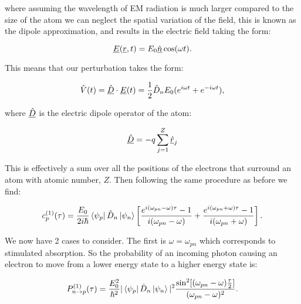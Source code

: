 \noindent where assuming the wavelength of EM radiation is much larger compared to the size of the atom we can neglect the spatial variation of the field, this is known as the dipole approximation, and results in the electric field taking the form:

\begin{equation}
    \underline{E}(\underline{r}, t) = E_0 \underline{\Hat{n}}\cos(\omega t).
    \label{DipoleApproximationElectricField}
\end{equation}

\noindent This means that our perturbation takes the form:

\begin{equation}
    \Hat{V}(t) = \underline{\Hat{D}} \cdot \underline{E}(t) = \frac{1}{2} \Hat{D}_n E_0 (e^{i\omega t} + e^{-i\omega t})
    \label{PerturbationEM},
\end{equation}

\noindent where $\underline{\Hat{D}}$ is the electric dipole operator of the atom:

\begin{equation}
    \underline{\Hat{D}} = -q \sum_{j = 1}^Z \underline{\Hat{r}}_j
    \label{ElectricDipoleOperator}
\end{equation}

\noindent This is effectively a sum over all the positions of the electrons that surround an atom with atomic number, $Z$. Then following the same procedure as before we find:

\begin{equation}
    c^{(1)}_p(\tau) = \frac{E_0}{2i\hbar}\bra{\psi_p} \Hat{D}_n \ket{\psi_n}\left[\frac{e^{i(\omega_{pn} - \omega)\tau} - 1}{i(\omega_{pn} - \omega)} + \frac{e^{i(\omega_{pn} + \omega)\tau} - 1}{i(\omega_{pn} + \omega)}\right].
    \label{CoefficientEM}
\end{equation}

\noindent We now have 2 cases to consider. The first is $\omega = \omega_{pn}$ which corresponds to stimulated absorption. So the probability of an incoming photon causing an electron to move from a lower energy state to a higher energy state is:

\begin{equation}
    P^{(1)}_{n\rightarrow p}(\tau) = \frac{E_0^2}{\hbar^2} |\bra{\psi_p} \Hat{D}_n \ket{\psi_n}|^2 \frac{\sin^2[(\omega_{pn} - \omega)\frac{\tau}{2}]}{(\omega_{pn} - \omega)^2}.
    \label{StimulatedAbsorption}
\end{equation}


